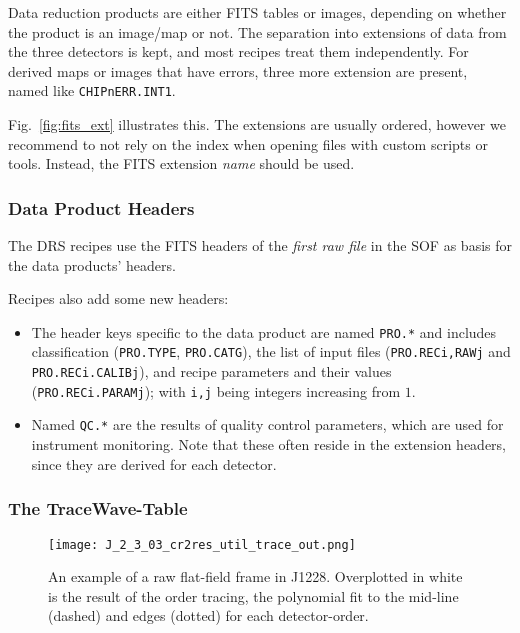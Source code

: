 Data reduction products are either FITS tables or images, depending on whether
the product is an image/map or not. The separation into extensions of data from
the three detectors is kept, and most recipes treat them independently. For
derived maps or images that have errors, three more extension are present, named
like \texttt{CHIPnERR.INT1}.

Fig.~\ref{fig:fits_ext} illustrates this. The extensions are usually ordered,
however we recommend to not rely on the index when opening files with custom
scripts or tools. Instead, the FITS extension \emph{name} should be used.


\subsubsection{Data Product Headers}

The DRS recipes use the FITS headers of the \emph{first raw file} in the SOF as
basis for the data products' headers.

Recipes also add some new headers:

\begin{itemize}
    \item The header keys specific to the data product are named \verb!PRO.*! and includes classification (\verb!PRO.TYPE!, \verb!PRO.CATG!), the list of input files (\verb!PRO.RECi,RAWj! and \verb!PRO.RECi.CALIBj!), and recipe parameters and their values (\verb!PRO.RECi.PARAMj!); with \verb!i,j! being integers increasing from $1$.
    \item Named \verb!QC.*! are the results of quality control parameters, which are used for instrument monitoring. Note that these often reside in the extension headers, since they are derived for each detector.
\end{itemize}

\subsubsection{The TraceWave-Table}
\label{sec:tracewave}

\begin{figure}[!tb]
    \begin{center}
      \texttt{[image: J\_2\_3\_03\_cr2res\_util\_trace\_out.png]}
    \end{center}
    \caption{
      \label{fig:flat_trace}
      An example of a raw flat-field frame in J1228. Overplotted in white is 
      the result of the order tracing, the polynomial fit to the mid-line
      (dashed) and edges (dotted) for each detector-order.
      }
  \end{figure}

